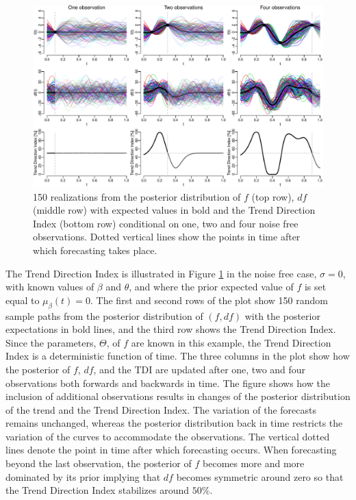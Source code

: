 \documentclass[11pt,]{article}
\theoremstyle{nonumberplain}
\begin{document}
\begin{figure}[htb]
\center\includegraphics{../figures/TDIexample}
\caption{150 realizations from the posterior distribution of $f$ (top row), $df$ (middle row) with expected values in bold and the Trend Direction Index (bottom row) conditional on one, two and four noise free observations. Dotted vertical lines show the points in time after which forecasting takes place.}
\label{fig:probabilisticExample}
\end{figure}

The Trend Direction Index is illustrated in Figure
\ref{fig:probabilisticExample} in the noise free case, \(\sigma = 0\),
with known values of \(\beta\) and \(\theta\), and where the prior
expected value of \(f\) is set equal to \(\mu_{\beta}(t) = 0\). The
first and second rows of the plot show 150 random sample paths from the
posterior distribution of \((f, df)\) with the posterior expectations in
bold lines, and the third row shows the Trend Direction Index. Since the
parameters, \(\Theta\), of \(f\) are known in this example, the Trend
Direction Index is a deterministic function of time. The three columns
in the plot show how the posterior of \(f\), \(df\), and the
\(\mathrm{TDI}\) are updated after one, two and four observations both
forwards and backwards in time. The figure shows how the inclusion of
additional observations results in changes of the posterior distribution
of the trend and the Trend Direction Index. The variation of the
forecasts remains unchanged, whereas the posterior distribution back in
time restricts the variation of the curves to accommodate the
observations. The vertical dotted lines denote the point in time after
which forecasting occurs. When forecasting beyond the last observation,
the posterior of \(f\) becomes more and more dominated by its prior
implying that \(df\) becomes symmetric around zero so that the Trend
Direction Index stabilizes around \(50\%\).
\end{document}
